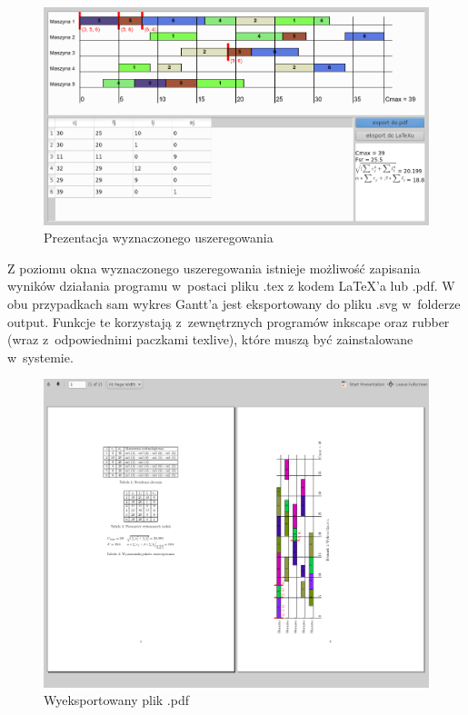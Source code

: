 \documentclass[twoside]{kInzynierka}
\begin{document}
\begin{figure}[htb]
    \centering
    \includegraphics[width=\textwidth, keepaspectratio=true]{./obrazki/wykres}
    \caption{Prezentacja wyznaczonego uszeregowania}
\end{figure}

Z poziomu okna wyznaczonego uszeregowania istnieje możliwość zapisania wyników działania programu w~postaci pliku .tex z kodem \LaTeX{}'a lub .pdf. W obu przypadkach sam wykres Gantt'a jest eksportowany do pliku .svg w~folderze output. Funkcje te korzystają z~zewnętrznych programów inkscape oraz rubber (wraz z~odpowiednimi paczkami texlive), które muszą być zainstalowane w~systemie. 

\begin{figure}[htb]
    \centering
    \includegraphics[width=\textwidth, keepaspectratio=true]{./obrazki/pdf}
    \caption{Wyeksportowany plik .pdf}
\end{figure}
\end{document}
